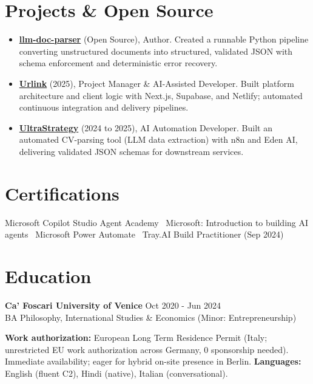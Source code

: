 \documentclass[a4paper,10pt]{article}
\begin{document}
\section{Projects \& Open Source}
\begin{itemize}
 \item \textbf{\href{https://github.com/prab-gupta/llm-doc-parser}{llm-doc-parser}} (Open Source), Author. Created a runnable Python pipeline converting unstructured documents into structured, validated JSON with schema enforcement and deterministic error recovery.
 \item \textbf{\href{https://smarturlink.com/}{Urlink}} (2025), Project Manager \& AI-Assisted Developer. Built platform architecture and client logic with Next.js, Supabase, and Netlify; automated continuous integration and delivery pipelines.
 \item \textbf{\href{https://ultrastrategy.com}{UltraStrategy}} (2024 to 2025), AI Automation Developer. Built an automated CV-parsing tool (LLM data extraction) with n8n and Eden AI, delivering validated JSON schemas for downstream services.
\end{itemize}

\section{Certifications}
Microsoft Copilot Studio Agent Academy \textbullet\ Microsoft: Introduction to building AI agents \textbullet\ Microsoft Power Automate \textbullet\ Tray.AI Build Practitioner (Sep 2024)

\section{Education}
\textbf{Ca' Foscari University of Venice} \hfill Oct 2020 - Jun 2024\\
BA Philosophy, International Studies \& Economics (Minor: Entrepreneurship)

\vspace{2pt}
{\small \textbf{Work authorization:} European Long Term Residence Permit (Italy; unrestricted EU work authorization across Germany, 0 sponsorship needed). Immediate availability; eager for hybrid on-site presence in Berlin. \quad \textbf{Languages:} English (fluent C2), Hindi (native), Italian (conversational).}
\end{document}
